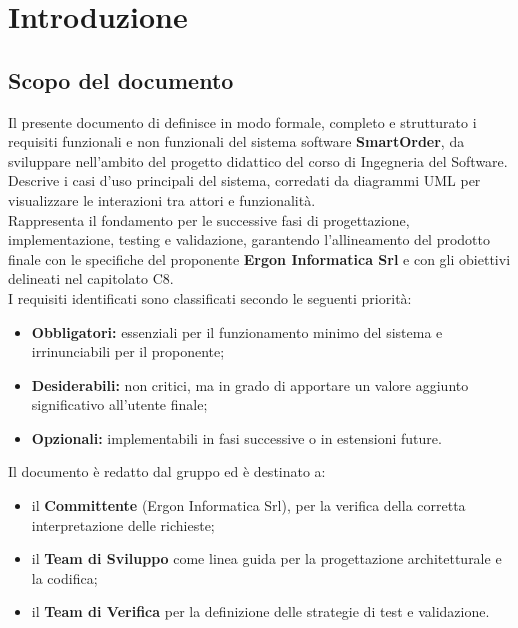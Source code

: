\section{Introduzione}
	\subsection{Scopo del documento}
	Il presente documento di  definisce in modo formale, completo e strutturato i requisiti funzionali e non funzionali del sistema software \textbf{SmartOrder}, da sviluppare nell'ambito del progetto didattico del corso di Ingegneria del Software.\\
	Descrive i casi d'uso principali del sistema, corredati da diagrammi UML per visualizzare le interazioni tra attori e funzionalità.\\
	Rappresenta il fondamento per le successive fasi di progettazione, implementazione, testing e validazione, garantendo l'allineamento del prodotto finale con le specifiche del proponente \textbf{Ergon Informatica Srl} e con gli obiettivi delineati nel capitolato C8.\\
	I requisiti identificati sono classificati secondo le seguenti priorità:
	\vspace{-0.3em}
	\begin{itemize}
	    \item \textbf{Obbligatori:} essenziali per il funzionamento minimo del sistema e irrinunciabili per il proponente;
	    \item \textbf{Desiderabili:} non critici, ma in grado di apportare un valore aggiunto significativo all'utente finale;
	    \item \textbf{Opzionali:} implementabili in fasi successive o in estensioni future.
	\end{itemize}

	Il documento è redatto dal gruppo \textbf{} ed è destinato a:

	\vspace{-0.3em}
	\begin{itemize}
	    \item il \textbf{Committente} (Ergon Informatica Srl), per la verifica della corretta interpretazione delle richieste;
	    \item il \textbf{Team di Sviluppo} come linea guida per la progettazione architetturale e la codifica;
	    \item il \textbf{Team di Verifica} per la definizione delle strategie di test e validazione.
	\end{itemize}

